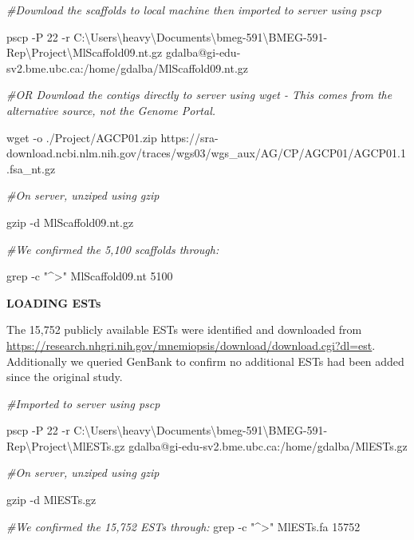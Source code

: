 \documentclass[
]{article}
\newenvironment{Shaded}{\begin{snugshade}}{\end{snugshade}}
\newcommand{\CommentTok}[1]{\textcolor[rgb]{0.56,0.35,0.01}{\textit{#1}}}
\newcommand{\ExtensionTok}[1]{#1}
\newcommand{\FunctionTok}[1]{\textcolor[rgb]{0.00,0.00,0.00}{#1}}
\newcommand{\NormalTok}[1]{#1}
\newcommand{\StringTok}[1]{\textcolor[rgb]{0.31,0.60,0.02}{#1}}
\begin{document}
\begin{Shaded}
\begin{Highlighting}[]

\CommentTok{\#Download the scaffolds to local machine then imported to server using pscp}

\ExtensionTok{pscp}\NormalTok{ {-}P 22 {-}r C:\textbackslash{}Users\textbackslash{}heavy\textbackslash{}Documents\textbackslash{}bmeg{-}591\textbackslash{}BMEG{-}591{-}Rep\textbackslash{}Project\textbackslash{}MlScaffold09.nt.gz gdalba@gi{-}edu{-}sv2.bme.ubc.ca:/home/gdalba/MlScaffold09.nt.gz}

\CommentTok{\#OR Download the contigs directly to server using wget {-} This comes from the alternative source, not the Genome Portal.}

\FunctionTok{wget}\NormalTok{ {-}o ./Project/AGCP01.zip https://sra{-}download.ncbi.nlm.nih.gov/traces/wgs03/wgs\_aux/AG/CP/AGCP01/AGCP01.1.fsa\_nt.gz}

\CommentTok{\#On server, unziped using gzip}

\FunctionTok{gzip}\NormalTok{ {-}d MlScaffold09.nt.gz}

\CommentTok{\#We confirmed the 5,100 scaffolds through:}

\FunctionTok{grep}\NormalTok{ {-}c }\StringTok{"\^{}\textgreater{}"}\NormalTok{ MlScaffold09.nt}
\ExtensionTok{5100}
\end{Highlighting}
\end{Shaded}

\textbf{LOADING ESTs}

The 15,752 publicly available ESTs were identified and downloaded from
\url{https://research.nhgri.nih.gov/mnemiopsis/download/download.cgi?dl=est}.
Additionally we queried GenBank to confirm no additional ESTs had been
added since the original study.

\begin{Shaded}
\begin{Highlighting}[]

\CommentTok{\#Imported to server using pscp}

\ExtensionTok{pscp}\NormalTok{ {-}P 22 {-}r C:\textbackslash{}Users\textbackslash{}heavy\textbackslash{}Documents\textbackslash{}bmeg{-}591\textbackslash{}BMEG{-}591{-}Rep\textbackslash{}Project\textbackslash{}MlESTs.gz gdalba@gi{-}edu{-}sv2.bme.ubc.ca:/home/gdalba/MlESTs.gz}

\CommentTok{\#On server, unziped using gzip}

\FunctionTok{gzip}\NormalTok{ {-}d MlESTs.gz}

\CommentTok{\#We confirmed the 15,752 ESTs through:}
\FunctionTok{grep}\NormalTok{ {-}c }\StringTok{"\^{}\textgreater{}"}\NormalTok{ MlESTs.fa}
\ExtensionTok{15752}
\end{Highlighting}
\end{Shaded}
\end{document}
